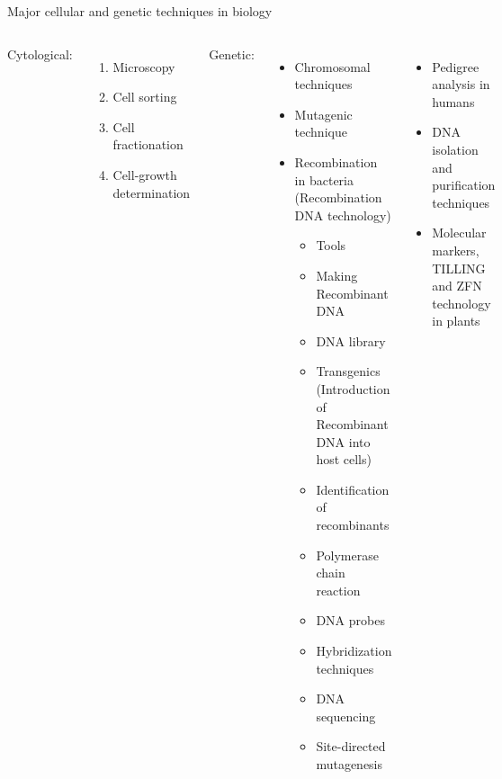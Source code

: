 \documentclass[
  ignorenonframetext,
  aspectratio=169]{beamer}
\begin{document}
\begin{frame}{Major cellular and genetic techniques in biology}
\protect\hypertarget{major-cellular-and-genetic-techniques-in-biology}{}
\begin{columns}[T,onlytextwidth]
  \footnotesize
  Cytological:
  \begin{enumerate}
  \item Microscopy
  \item Cell sorting
  \item Cell fractionation
  \item Cell-growth determination
  \end{enumerate}
  
  Genetic:
  \begin{itemize}
  \item Chromosomal techniques
  \item Mutagenic technique
  \item Recombination in bacteria (Recombination DNA technology)
    \begin{itemize}\footnotesize
    \item Tools
    \item Making Recombinant DNA
    \item DNA library
    \item Transgenics (Introduction of Recombinant DNA into host cells)
    \item Identification of recombinants
    \item Polymerase chain reaction
    \item DNA probes
    \item Hybridization techniques
    \item DNA sequencing
    \item Site-directed mutagenesis
    \end{itemize}
  \end{itemize}
  \begin{itemize}
  \item Pedigree analysis in humans
  \item DNA isolation and purification techniques
  \item Molecular markers, TILLING and ZFN technology in plants
  \end{itemize}
\end{columns}
\end{frame}
\end{document}
